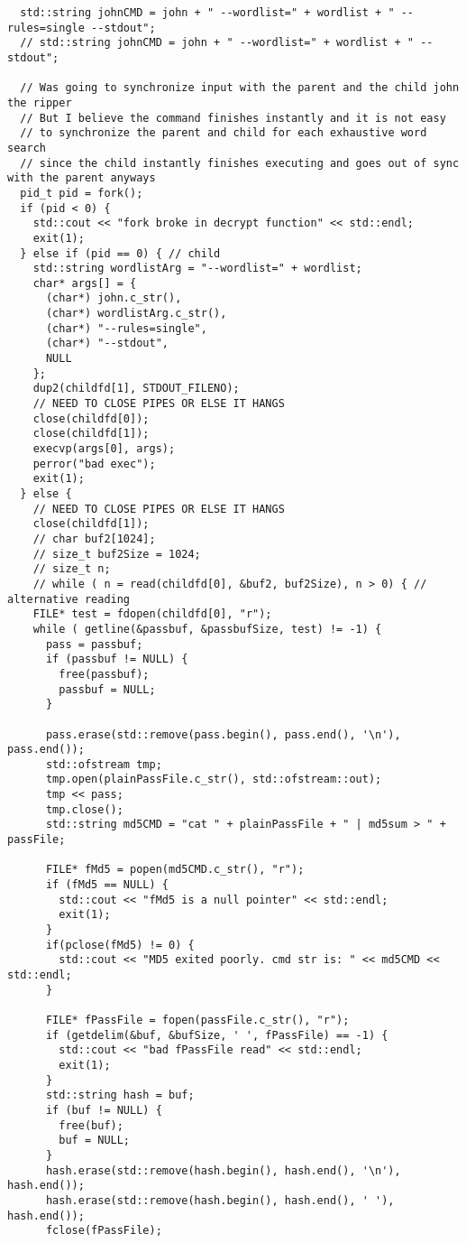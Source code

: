 \documentclass[12pt]{article}
\begin{document}
\begin{lstlisting}
  std::string johnCMD = john + " --wordlist=" + wordlist + " --rules=single --stdout";
  // std::string johnCMD = john + " --wordlist=" + wordlist + " --stdout";

  // Was going to synchronize input with the parent and the child john the ripper
  // But I believe the command finishes instantly and it is not easy
  // to synchronize the parent and child for each exhaustive word search
  // since the child instantly finishes executing and goes out of sync with the parent anyways
  pid_t pid = fork();
  if (pid < 0) {
    std::cout << "fork broke in decrypt function" << std::endl;
    exit(1);
  } else if (pid == 0) { // child
    std::string wordlistArg = "--wordlist=" + wordlist;
    char* args[] = {
      (char*) john.c_str(),
      (char*) wordlistArg.c_str(),
      (char*) "--rules=single",
      (char*) "--stdout",
      NULL
    };
    dup2(childfd[1], STDOUT_FILENO);
    // NEED TO CLOSE PIPES OR ELSE IT HANGS
    close(childfd[0]);
    close(childfd[1]);
    execvp(args[0], args);
    perror("bad exec");
    exit(1);
  } else {
    // NEED TO CLOSE PIPES OR ELSE IT HANGS
    close(childfd[1]);
    // char buf2[1024];
    // size_t buf2Size = 1024;
    // size_t n;
    // while ( n = read(childfd[0], &buf2, buf2Size), n > 0) { // alternative reading
    FILE* test = fdopen(childfd[0], "r");
    while ( getline(&passbuf, &passbufSize, test) != -1) {
      pass = passbuf;
      if (passbuf != NULL) {
        free(passbuf);
        passbuf = NULL;
      }

      pass.erase(std::remove(pass.begin(), pass.end(), '\n'), pass.end());
      std::ofstream tmp;
      tmp.open(plainPassFile.c_str(), std::ofstream::out);
      tmp << pass;
      tmp.close();
      std::string md5CMD = "cat " + plainPassFile + " | md5sum > " + passFile;

      FILE* fMd5 = popen(md5CMD.c_str(), "r");
      if (fMd5 == NULL) {
        std::cout << "fMd5 is a null pointer" << std::endl;
        exit(1);
      }
      if(pclose(fMd5) != 0) {
        std::cout << "MD5 exited poorly. cmd str is: " << md5CMD << std::endl;
      }

      FILE* fPassFile = fopen(passFile.c_str(), "r");
      if (getdelim(&buf, &bufSize, ' ', fPassFile) == -1) {
        std::cout << "bad fPassFile read" << std::endl;
        exit(1);
      }
      std::string hash = buf;
      if (buf != NULL) {
        free(buf);
        buf = NULL;
      }
      hash.erase(std::remove(hash.begin(), hash.end(), '\n'), hash.end());
      hash.erase(std::remove(hash.begin(), hash.end(), ' '), hash.end());
      fclose(fPassFile);


\end{lstlisting}
\end{document}
